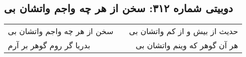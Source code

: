 \begin{center}
\section*{دوبیتی شماره ۳۱۲: سخن از هر چه واجم واتشان بی}
\label{sec:312}
\begin{longtable}{l p{0.5cm} r}
سخن از هر چه واجم واتشان بی
&&
حدیث از بیش و از کم واتشان بی
\\
بدریا گر روم گوهر بر آرم
&&
هر آن گوهر که وینم واتشان بی
\\
\end{longtable}
\end{center}
